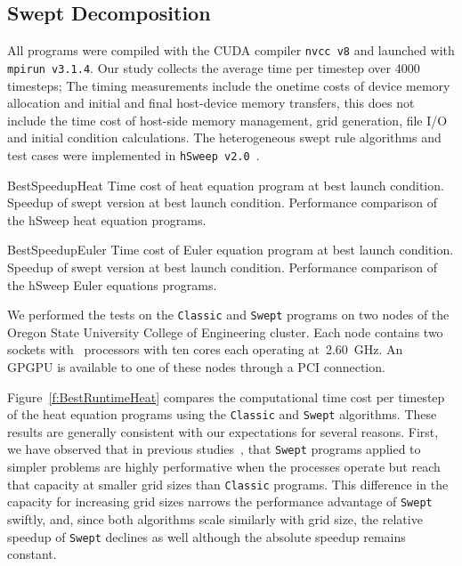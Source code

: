 
\subsection{Swept Decomposition}  \label{sec:SweptDecompRslt}

All programs were compiled with the CUDA compiler \texttt{nvcc v8} and launched with \texttt{mpirun v3.1.4}.
Our study collects the average time per timestep over \num{4000} timesteps; 
The timing measurements include the onetime costs of device memory allocation and initial and final host-device memory transfers, this does not include the time cost of host-side memory management, grid generation, file I/O and initial condition calculations.
The heterogeneous swept rule algorithms and test cases were implemented in \texttt{hSweep v2.0}~\cite{hSweepz}.

{BestSpeedupHeat}
{Time cost of heat equation program at best launch condition.}
{Speedup of swept version at best launch condition.}
{Performance comparison of the hSweep heat equation programs.}

{BestSpeedupEuler}
{Time cost of Euler equation program at best launch condition.}
{Speedup of swept version at best launch condition.}
{Performance comparison of the hSweep Euler equations programs.}

We performed the tests on the \texttt{Classic} and \texttt{Swept}
programs on two nodes of the Oregon State University College of Engineering cluster.
Each node contains two sockets with~\CCPU{} processors with ten cores each operating at~\SI{2.60}{\giga\hertz}.
An~\CGPU{} GPGPU is available to one of these nodes through a PCI connection.

Figure~\ref{f:BestRuntimeHeat} compares the computational time cost per timestep of the heat equation programs
using the \texttt{Classic} and \texttt{Swept} algorithms.
These results are generally consistent with our expectations for several reasons.
First, we have observed that in previous studies~\cite{OurJCP, alhubail:16jcp}, that
\texttt{Swept} programs applied to simpler problems are highly performative when the processes operate but reach that
capacity at smaller grid sizes than \texttt{Classic} programs.
This difference in the capacity for increasing grid sizes narrows the performance advantage of \texttt{Swept} swiftly, and, since both algorithms scale similarly with grid size, the relative speedup of \texttt{Swept} declines as well although the absolute speedup remains constant.

